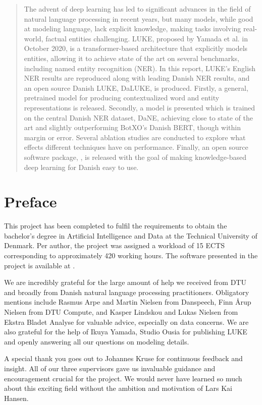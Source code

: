 \documentclass[12pt, fleqn]{report}
\begin{document}
\begin{abstract}
    The advent of deep learning has led to significant advances in the field of natural language processing in recent years, but many models, while good at modeling language, lack explicit knowledge, making tasks involving real-world, factual entities challenging.
    LUKE, proposed by Yamada et al. in October 2020, is a transformer-based architecture that explicitly models entities, allowing it to achieve state of the art on several benchmarks, including named entity recognition (NER).
    In this report, LUKE's English NER results are reproduced along with leading Danish NER results, and an open source Danish LUKE, DaLUKE, is produced.
    Firstly, a general, pretrained model for producing contextualized word and entity representations is released.
    Secondly, a model is presented which is trained on the central Danish NER dataset, DaNE, achieving close to state of the art and slightly outperforming BotXO's Danish BERT, though within margin or error.
    Several ablation studies are conducted to explore what effects different techniques have on performance.
    Finally, an open source software package, , is released with the goal of making knowledge-based deep learning for Danish easy to use.
\end{abstract}

\chapter*{Preface}
This project has been completed to fulfil the requirements to obtain the bachelor's degree in Artificial Intelligence and Data at the Technical University of Denmark.
Per author, the project was assigned a workload of 15 ECTS corresponding to approximately 420 working hours.
The software presented in the project is available at .

We are incredibly grateful for the large amount of help we received from DTU and broadly from Danish natural language processing practitioners.
Obligatory mentions include Rasmus Arpe and Martin Nielsen from Danspeech, Finn Årup Nielsen from DTU Compute, and Kasper Lindskou and Lukas Nielsen from Ekstra Bladet Analyse for valuable advice, especially on data concerns.
We are also grateful for the help of Ikuya Yamada, Studio Ousia for publishing LUKE and openly answering all our questions on modeling details.

A special thank you goes out to Johannes Kruse for continuous feedback and insight.
All of our three supervisors gave us invaluable guidance and encouragement crucial for the project.
We would never have learned so much about this exciting field without the ambition and motivation of Lars Kai Hansen.
\end{document}
